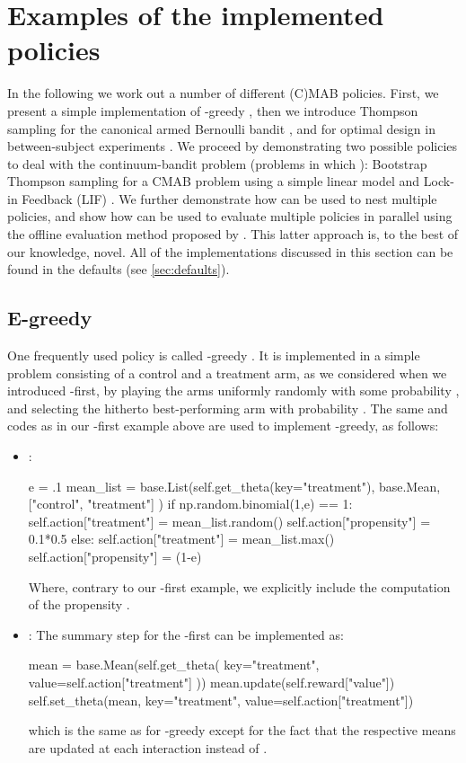 \documentclass[nojss]{jss}
\begin{document}
\section{Examples of the implemented policies}
\label{sec:examples}

In the following we work out a number of different (C)MAB policies. First, we present a simple implementation of -greedy \citep{sutton1998introduction}, then we introduce Thompson sampling for the canonical  armed Bernoulli bandit \citep{thompson1933likelihood}, and for optimal design in between-subject experiments \citep{Kaptein2014a}. We proceed by demonstrating two possible policies to deal with the continuum-bandit problem (problems in which ): Bootstrap Thompson sampling for a CMAB problem using a simple linear model \citep{Kaptein} and Lock-in Feedback (LIF) \citep{Kaptein2014d}. We further demonstrate how  can be used to nest multiple policies, and show how  can be used to evaluate multiple policies in parallel using the offline evaluation method proposed by \citet{Li2010a}. This latter approach is, to the best of our knowledge, novel. All of the implementations discussed in this section can be found in the defaults (see \ref{sec:defaults}).

\subsection{E-greedy}
\label{subsec:egreedy}

One frequently used policy is called -greedy \citep{sutton1998introduction}. It is implemented in a simple problem consisting of a control and a treatment arm, as we considered when we introduced -first, by playing the arms uniformly randomly with some probability , and selecting the hitherto best-performing arm with probability . The same  and  codes as in our -first example above are used to implement -greedy, as follows:

\begin{itemize}
\item {}: 
\begin{Code}
e = .1
mean_list = base.List(self.get_theta(key="treatment"), 
    base.Mean, ["control", "treatment"]
    )
if np.random.binomial(1,e) == 1:
    self.action["treatment"] = mean_list.random()
    self.action["propensity"] = 0.1*0.5
else:
    self.action["treatment"] = mean_list.max()
    self.action["propensity"] = (1-e)
\end{Code}
Where, contrary to our -first example, we explicitly include the computation of the propensity .
\item {}: The summary step for the -first can be implemented as:
\begin{Code}
mean = base.Mean(self.get_theta(
         key="treatment", value=self.action["treatment"]
         ))
mean.update(self.reward["value"])
self.set_theta(mean, key="treatment", value=self.action["treatment"])
\end{Code}
which is the same as for -greedy except for the fact that the respective means are updated at each interaction  instead of .
\end{itemize}
\end{document}
